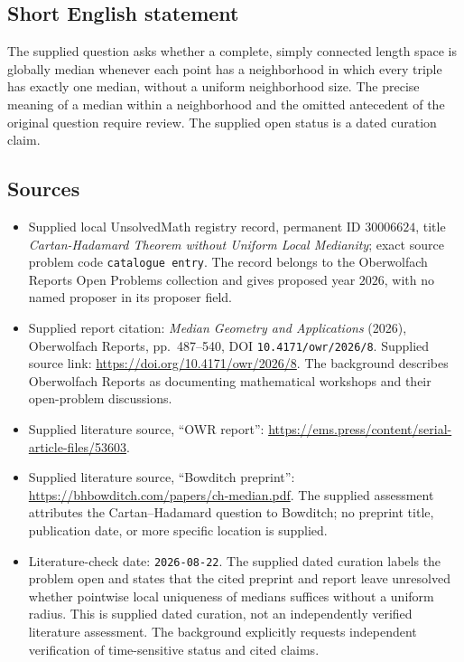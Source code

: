 \documentclass[11pt]{article}
\begin{document}
\subsection{Short English statement}
The supplied question asks whether a complete, simply connected length space is globally median whenever each point has a neighborhood in which every triple has exactly one median, without a uniform neighborhood size. The precise meaning of a median within a neighborhood and the omitted antecedent of the original question require review. The supplied open status is a dated curation claim.
\subsection{Sources}
\begin{itemize}
\item Supplied local UnsolvedMath registry record, permanent ID \(30006624\), title \emph{Cartan-Hadamard Theorem without Uniform Local Medianity}; exact source problem code \texttt{catalogue entry}. The record belongs to the Oberwolfach Reports Open Problems collection and gives proposed year \(2026\), with no named proposer in its proposer field.
\item Supplied report citation: \emph{Median Geometry and Applications} (2026), Oberwolfach Reports, pp.~487--540, DOI \texttt{10.4171/owr/2026/8}. Supplied source link: \url{https://doi.org/10.4171/owr/2026/8}. The background describes Oberwolfach Reports as documenting mathematical workshops and their open-problem discussions.
\item Supplied literature source, ``OWR report'': \url{https://ems.press/content/serial-article-files/53603}.
\item Supplied literature source, ``Bowditch preprint'': \url{https://bhbowditch.com/papers/ch-median.pdf}. The supplied assessment attributes the Cartan--Hadamard question to Bowditch; no preprint title, publication date, or more specific location is supplied.
\item Literature-check date: \texttt{2026-08-22}. The supplied dated curation labels the problem open and states that the cited preprint and report leave unresolved whether pointwise local uniqueness of medians suffices without a uniform radius. This is supplied dated curation, not an independently verified literature assessment. The background explicitly requests independent verification of time-sensitive status and cited claims.
\end{itemize}
\end{document}
